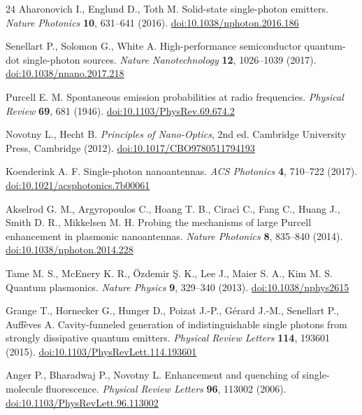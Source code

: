 \begin{thebibliography}{24}
 Aharonovich I., Englund D., Toth M. Solid-state single-photon emitters. \textit{Nature Photonics} \textbf{10}, 631--641 (2016). \href{https://doi.org/10.1038/nphoton.2016.186}{doi:10.1038/nphoton.2016.186}

 Senellart P., Solomon G., White A. High-performance semiconductor quantum-dot single-photon sources. \textit{Nature Nanotechnology} \textbf{12}, 1026--1039 (2017). \href{https://doi.org/10.1038/nnano.2017.218}{doi:10.1038/nnano.2017.218}

 Purcell E. M. Spontaneous emission probabilities at radio frequencies. \textit{Physical Review} \textbf{69}, 681 (1946). \href{https://doi.org/10.1103/PhysRev.69.674.2}{doi:10.1103/PhysRev.69.674.2}

 Novotny L., Hecht B. \textit{Principles of Nano-Optics}, 2nd ed. Cambridge University Press, Cambridge (2012). \href{https://doi.org/10.1017/CBO9780511794193}{doi:10.1017/CBO9780511794193}

 Koenderink A. F. Single-photon nanoantennas. \textit{ACS Photonics} \textbf{4}, 710--722 (2017). \href{https://doi.org/10.1021/acsphotonics.7b00061}{doi:10.1021/acsphotonics.7b00061}

 Akselrod G. M., Argyropoulos C., Hoang T. B., Ciracì C., Fang C., Huang J., Smith D. R., Mikkelsen M. H. Probing the mechanisms of large Purcell enhancement in plasmonic nanoantennas. \textit{Nature Photonics} \textbf{8}, 835--840 (2014). \href{https://doi.org/10.1038/nphoton.2014.228}{doi:10.1038/nphoton.2014.228}

 Tame M. S., McEnery K. R., Özdemir Ş. K., Lee J., Maier S. A., Kim M. S. Quantum plasmonics. \textit{Nature Physics} \textbf{9}, 329--340 (2013). \href{https://doi.org/10.1038/nphys2615}{doi:10.1038/nphys2615}

 Grange T., Hornecker G., Hunger D., Poizat J.-P., Gérard J.-M., Senellart P., Auffèves A. Cavity-funneled generation of indistinguishable single photons from strongly dissipative quantum emitters. \textit{Physical Review Letters} \textbf{114}, 193601 (2015). \href{https://doi.org/10.1103/PhysRevLett.114.193601}{doi:10.1103/PhysRevLett.114.193601}

 Anger P., Bharadwaj P., Novotny L. Enhancement and quenching of single-molecule fluorescence. \textit{Physical Review Letters} \textbf{96}, 113002 (2006). \href{https://doi.org/10.1103/PhysRevLett.96.113002}{doi:10.1103/PhysRevLett.96.113002}


\end{thebibliography}

